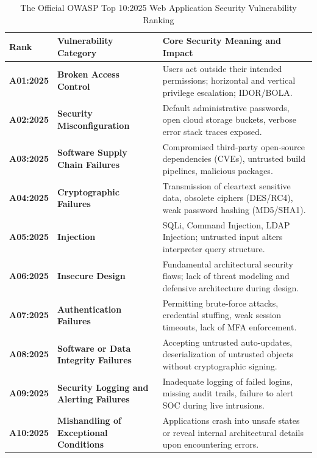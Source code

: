 \begin{table}[htbp]
\centering
\caption{The Official OWASP Top 10:2025 Web Application Security Vulnerability Ranking}
\label{tab:owasp_top_10_2025}
\begin{tabularx}{\textwidth}{l p{5cm} X}
\toprule
\textbf{Rank} & \textbf{Vulnerability Category} & \textbf{Core Security Meaning and Impact} \\
\midrule
\textbf{A01:2025} & \textbf{Broken Access Control} & Users act outside their intended permissions; horizontal and vertical privilege escalation; IDOR/BOLA. \\
\textbf{A02:2025} & \textbf{Security Misconfiguration} & Default administrative passwords, open cloud storage buckets, verbose error stack traces exposed. \\
\textbf{A03:2025} & \textbf{Software Supply Chain Failures} & Compromised third-party open-source dependencies (CVEs), untrusted build pipelines, malicious packages. \\
\textbf{A04:2025} & \textbf{Cryptographic Failures} & Transmission of cleartext sensitive data, obsolete ciphers (DES/RC4), weak password hashing (MD5/SHA1). \\
\textbf{A05:2025} & \textbf{Injection} & SQLi, Command Injection, LDAP Injection; untrusted input alters interpreter query structure. \\
\textbf{A06:2025} & \textbf{Insecure Design} & Fundamental architectural security flaws; lack of threat modeling and defensive architecture during design. \\
\textbf{A07:2025} & \textbf{Authentication Failures} & Permitting brute-force attacks, credential stuffing, weak session timeouts, lack of MFA enforcement. \\
\textbf{A08:2025} & \textbf{Software or Data Integrity Failures} & Accepting untrusted auto-updates, deserialization of untrusted objects without cryptographic signing. \\
\textbf{A09:2025} & \textbf{Security Logging and Alerting Failures} & Inadequate logging of failed logins, missing audit trails, failure to alert SOC during live intrusions. \\
\textbf{A10:2025} & \textbf{Mishandling of Exceptional Conditions} & Applications crash into unsafe states or reveal internal architectural details upon encountering errors. \\
\bottomrule
\end{tabularx}
\end{table}

